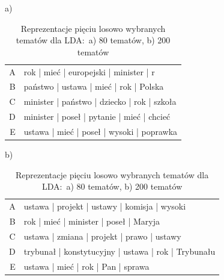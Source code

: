 	\begin{table}[htb]
		\caption{Reprezentacje pięciu losowo wybranych tematów dla LDA:\ a) 80 tematów, b) 200 tematów}\label{tab:lda_topics} %
		\centering
		a) %
		\begin{tabularx}{.7\textwidth}{rl}
			\toprule
			A	&	rok | mieć | europejski | minister | r	\\ 
			B	&	państwo | ustawa | mieć | rok | Polska	\\ 
			C	&	minister | państwo | dziecko | rok | szkoła	\\
			D	& minister | poseł | pytanie | mieć | chcieć	\\
			E	& ustawa | mieć | poseł | wysoki | poprawka	\\
			\midrule
		\end{tabularx}

		b) %
		\begin{tabularx}{.7\textwidth}{rl}
			A	&	ustawa | projekt | ustawy | komisja | wysoki	\\ 
			B	&	rok | mieć | minister | poseł | Maryja \\ 
			C	&	ustawa | zmiana | projekt | prawo | ustawy \\
			D	&	trybunał | konstytucyjny | ustawa | rok | Trybunału	\\
			E	&	ustawa | mieć | rok | Pan | sprawa	\\
			\bottomrule
		\end{tabularx}
	\end{table}
